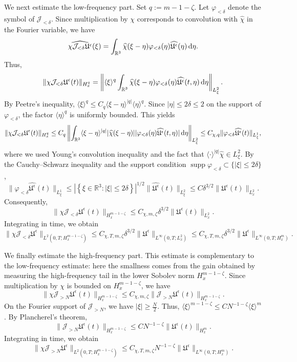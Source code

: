\documentclass[10pt,reqno]{amsart}
\numberwithin{equation}{section}
\newcommand{\lt}{\left}
\newcommand{\rt}{\right}
\newcommand{\lal}{\langle}
\newcommand{\ral}{\rangle}
\newcommand{\mR}{\mathbb{R}}
\newcommand{\intr}{\int_{\mR^3}}
\newcommand{\R}{\mathbb R}
\newcommand{\bq}{\begin{equation}}
\newcommand{\eq}{\end{equation}}
\newcommand{\calJ}{\mathcal J}
\begin{document}
We next estimate the low-frequency part. Set $q := m-1-\zeta$. Let $\varphi_{<\delta}$ denote the symbol of $\calJ_{<\delta}$. Since multiplication by $\chi$ corresponds to convolution with $\widehat\chi$ in the Fourier variable, we have
\[
\widehat{ \chi \calJ_{<\delta} \mathfrak U^\epsilon }(\xi) = \intr  \widehat\chi(\xi-\eta) \varphi_{<\delta}(\eta) \widehat{ \mathfrak U^\epsilon }(\eta) \,\textnormal{d}\eta.
\]
Thus, 
\[
\|\chi\calJ_{<\delta}\mathfrak U^\epsilon(t)\|_{H^q_x} = \lt\| \langle\xi\rangle^q \intr  \widehat\chi(\xi-\eta) \varphi_{<\delta}(\eta) \widehat{\mathfrak U^\epsilon}(t,\eta) \,\textnormal{d}\eta \rt\|_{L^2_\xi}. 
\]
By Peetre's inequality, $\langle\xi\rangle^q \le C_q \langle\xi-\eta\rangle^{|q|} \langle\eta\rangle^q$. Since $|\eta| \le 2\delta \le 2$ on the support of $\varphi_{<\delta}$, the factor $\langle\eta\rangle^q$ is uniformly bounded. This yields
\[
\|\chi\calJ_{<\delta}\mathfrak U^\epsilon(t)\|_{H^q_x}  \le C_q \left\| \intr  \langle\xi-\eta\rangle^{|q|} |\widehat\chi(\xi-\eta)| |\varphi_{<\delta}(\eta)\widehat{\mathfrak U^\epsilon}(t,\eta)| \,\textnormal{d}\eta \right\|_{L^2_\xi}  \le C_{\chi,q} \|\varphi_{<\delta}\widehat{\mathfrak U^\epsilon}(t)\|_{L^1_\xi}, 
\]
where we used Young's convolution inequality and the fact that $\lal\cdot\ral^{|q|}\widehat\chi\in L^2_\xi$. By the Cauchy--Schwarz inequality and the support condition $\operatorname{supp}\varphi_{<\delta}\subset\{|\xi|\le2\delta\}$, 
\[
\| \varphi_{<\delta} \widehat{\mathfrak U^\epsilon }(t) \|_{L^1_\xi} \le \lt| \lt\{ \xi\in\R^3 : |\xi| \le 2\delta \rt\} \rt|^{1/2} \| \widehat{ \mathfrak U^\epsilon }(t) \|_{L^2_\xi} \le C \delta^{3/2} \| \mathfrak U^\epsilon(t) \|_{L^2_x}.
\]
Consequently,
\[
\| \chi \calJ_{<\delta} \mathfrak U^\epsilon(t) \|_{H^{m-1-\zeta}_x} \le C_{\chi,m,\zeta} \delta^{3/2} \| \mathfrak U^\epsilon(t) \|_{L^2_x}.
\]
Integrating in time, we obtain 
\bq\label{eq:app-low-bnd} \|\chi\calJ_{<\delta}\mathfrak U^\epsilon\|_{L^2(0,T;H^{m-1-\zeta}_x)} \le C_{\chi,T,m,\zeta}\delta^{3/2} \|\mathfrak U^\epsilon\|_{L^\infty(0,T;L^2_x)} \le C_{\chi,T,m,\zeta} \delta^{3/2} \| \mathfrak U^\epsilon \|_{L^\infty(0,T;H^m_x)}. 
\eq 
 
We finally estimate the high-frequency part. This estimate is complementary to the low-frequency estimate: here the smallness comes from the gain obtained by measuring the high-frequency tail in the lower Sobolev norm $H^{m-1-\zeta}_x$. Since multiplication by $\chi$ is bounded on $H^{m-1-\zeta}_x$, we have
\[
\| \chi \calJ_{>N} \mathfrak U^\epsilon(t) \|_{H^{m-1-\zeta}_x} \le C_{\chi,m,\zeta} \| \calJ_{>N} \mathfrak U^\epsilon(t) \|_{H^{m-1-\zeta}_x}.
\]
On the Fourier support of $\calJ_{>N}$, we have $|\xi| \ge \frac{N}{2}$. Thus, $\langle\xi\rangle^{m-1-\zeta} \le C N^{-1-\zeta} \langle\xi\rangle^m$. By Plancherel's theorem,
\[
\| \calJ_{>N} \mathfrak U^\epsilon(t) \|_{H^{m-1-\zeta}_x} \le C N^{-1-\zeta} \| \mathfrak U^\epsilon(t) \|_{H^m_x}.
\]
Integrating in time, we obtain
\bq\label{eq:app-high-bnd}
\| \chi \calJ_{>N} \mathfrak U^\epsilon \|_{L^2(0,T;H^{m-1-\zeta}_x)} \le C_{\chi,T,m,\zeta} N^{-1-\zeta} \| \mathfrak U^\epsilon \|_{L^\infty(0,T;H^m_x)}.
\eq
\end{document}
